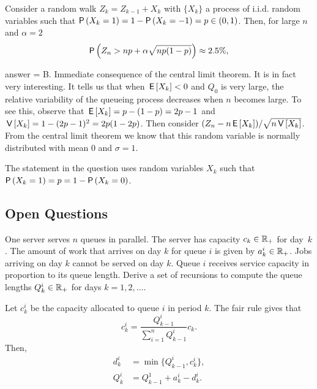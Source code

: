 \begin{exercise}[201902]
  Consider a random walk $Z_k = Z_{k-1} + X_k$ with $\{X_k\}$ a process of i.i.d. random variables such that $\P{X_k=1} = 1-\P{X_k=-1} = p \in (0, 1)$. Then, for large $n$ and $\alpha = 2$
  \begin{equation*}
    \P{Z_n >  np + \alpha \sqrt{np(1-p)}} \approx 2.5\%, 
  \end{equation*}


\begin{solution}
answer = B. Immediate consequence of the central limit theorem. It is in fact very interesting. It tells us that when $\,\mathsf{E}\left[X_k\right] < 0$ and $Q_0$ is very large, the relative variability of the queueing process decreases  when $n$ becomes large. To see this, observe that $\,\mathsf{E}\left[X_k\right] = p - (1-p)=2p-1$ and $\,\mathsf{V}\left[X_k\right] = 1 - (2p-1)^2 = 2p(1-2p)$. Then consider $(Z_n - n\,\mathsf{E}\left[X_k\right])/\sqrt{n\,\mathsf{V}\left[X_k\right]}$. From the central limit theorem we know that this random variable is normally distributed with mean 0 and $\sigma=1$. 

The statement in the question uses random variables $X_k$ such that $\P{X_k=1}=p = 1- \P{X_k=0}$. 
\end{solution}
\end{exercise}

\subsection{Open Questions}


\begin{exercise}[201704] One server serves $n$ queues in parallel. The
  server has capacity $c_k\in \mathbb{R}_+$ for day~$k$.  The amount of work
  that arrives on day $k$ for queue $i$ is given by $a_k^i\in \mathbb{R}_+$.
  Jobs arriving on day $k$ cannot be served on day $k$. Queue $i$
  receives service capacity in proportion to its queue length.  Derive
  a set of recursions  to compute the queue lengths $Q_k^i \in \mathbb{R}_+$ for days $k=1,2,\ldots$. 
\begin{solution}
    Let $c_k^i$ be the capacity allocated to queue $i$ in period $k$. The fair rule gives that 
    \begin{equation*}
      c_k^i = \frac{Q_{k-1}^i}{\sum_{i=1}^n Q_{k-1}^i } c_k.
    \end{equation*}
Then, 
\begin{equation*}
  \begin{split}
      d_k^i &= \min\{Q_{k-1}^i, c^i_k\}, \\
Q_k^i &= Q_{k-1}^1+a_k^i  - d_k^i.
  \end{split}
\end{equation*}
\end{solution}
  \end{exercise}

